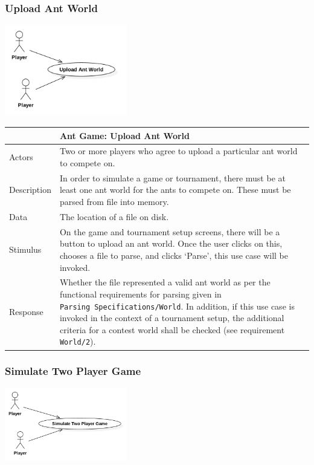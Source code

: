 \documentclass[11pt]{article}
\begin{document}
\subsubsection{Upload Ant World}\label{upload-ant-world}

\begin{center}
\includegraphics[width=0.4\textwidth]{diagrams/use-case-3-upload-ant-world.png}
\end{center}

\begin{longtable}[c]{@{}p{}p{}@{}}
\toprule
& Ant Game: Upload Ant World\tabularnewline
\midrule

Actors & Two or more players who agree to upload a particular ant world
to compete on.\tabularnewline
Description & In order to simulate a game or tournament, there must be
at least one ant world for the ants to compete on. These must be parsed
from file into memory.\tabularnewline
Data & The location of a file on disk.\tabularnewline
Stimulus & On the game and tournament setup screens, there will be a
button to upload an ant world. Once the user clicks on this, chooses a
file to parse, and clicks `Parse', this use case will be
invoked.\tabularnewline
Response & Whether the file represented a valid ant world as per the
functional requirements for parsing given in
\texttt{Parsing\ Specifications/World}. In addition, if this use case is
invoked in the context of a tournament setup, the additional criteria
for a contest world shall be checked (see requirement
\texttt{World/2}).\tabularnewline
\bottomrule
\end{longtable}

\subsubsection{Simulate Two Player Game}\label{simulate-two-player-game}

\begin{center}
\includegraphics[width=0.4\textwidth]{diagrams/use-case-4-two-player-game.png}
\end{center}
\end{document}
